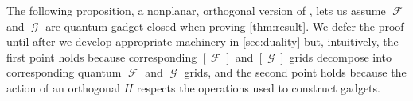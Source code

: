 \documentclass{article}
\makeatletter
\DeclareMathOperator{\fc}{\mathcal{F}}
\DeclareMathOperator{\gc}{\mathcal{G}}
\newcommand\IfRestateTF{%
  \ifx\label\thmt@gobble@label %
    \expandafter\@firstoftwo
  \else
    \expandafter\@secondoftwo
  \fi
}
\newcommand{\RestateRemark}{\IfRestateTF{{\normalfont\bfseries (Restated) }}{}}
\makeatother
\begin{document}
The following proposition, a
nonplanar, orthogonal version of \cite[Lemmas 31 and 32]{cai_planar_2023}, lets us assume
$\fc$ and $\gc$ are quantum-gadget-closed when proving \autoref{thm:result}.
We defer the proof until after we develop appropriate machinery in \autoref{sec:duality} but,
intuitively, the first point holds because corresponding $[\fc]$ and $[\gc]$ grids decompose
into corresponding quantum $\fc$ and $\gc$ grids, and the second point holds because
the action of an orthogonal $H$ respects the operations used to construct gadgets.

\end{document}
